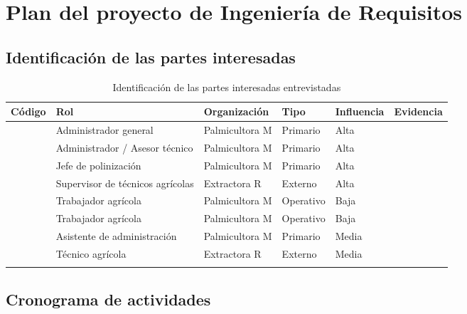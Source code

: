 
\newpage
\appendix
\section{Plan del proyecto de Ingeniería de Requisitos}

\subsection{Identificación de las partes interesadas}

\begin{longtable}{|C{1.6cm}|L{4.4cm}|C{1.8cm}|C{1.6cm}|C{1.6cm}|C{2.6cm}|}
\hline
{}\textbf{Código} & \textbf{Rol} & \textbf{Organización} & \textbf{Tipo} & \textbf{Influencia} & \textbf{Evidencia} \\
\hline
\endhead
{} & Administrador general & Palmicultora M & Primario & Alta &  \\ \hline
{} & Administrador / Asesor técnico & Palmicultora M & Primario & Alta &  \\ \hline
{} & Jefe de polinización & Palmicultora M & Primario & Alta &  \\ \hline
{} & Supervisor de técnicos agrícolas & Extractora R & Externo & Alta &  \\ \hline
{} & Trabajador agrícola & Palmicultora M & Operativo & Baja &  \\ \hline
{} & Trabajador agrícola & Palmicultora M & Operativo & Baja &  \\ \hline
{} & Asistente de administración & Palmicultora M & Primario & Media &  \\ \hline
{} & Técnico agrícola & Extractora R & Externo & Media &  \\ \hline
\caption{Identificación de las partes interesadas entrevistadas}
\end{longtable}

\subsection{Cronograma de actividades}

